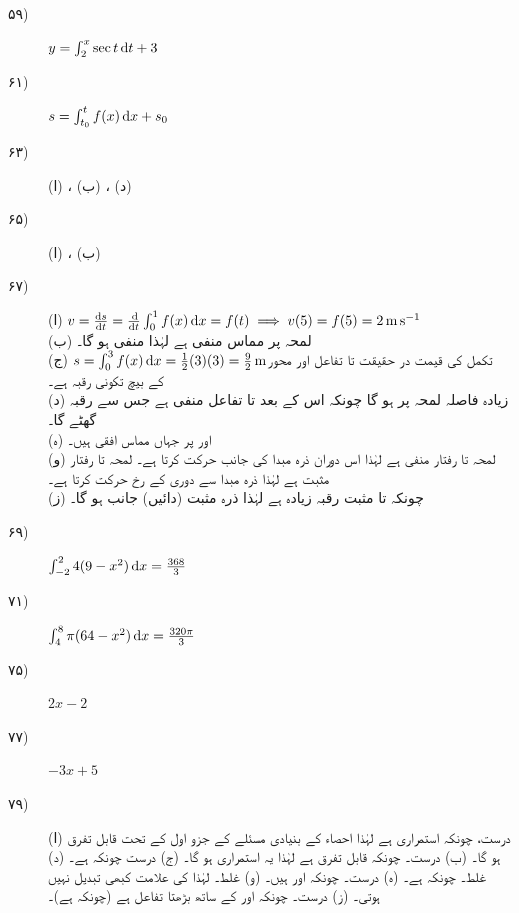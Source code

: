 \begin {description}
\item [
\protect ۵۹)
]
 $y=\int _2^x\sec t\dif t+3$ 
\item [
\protect ۶۱)
]
 $s=\int _{t_0}^tf(x)\dif x+s_0$ 
\item [
\protect ۶۳)
]
 (ا) ، (ب) ، (د)  
\item [
\protect ۶۵)
]
 (ا) ، (ب)  
\item [
\protect ۶۷)
]
 (ا) $v=\tfrac {\dif s}{\dif t}=\tfrac {\dif }{\dif t}\int _0^1f(x)\dif x=f(t)\implies v(5)=f(5)=\SI {2}{\meter \per \second }$\\ (ب) لمحہ  پر مماس منفی ہے لہٰذا  منفی ہو گا۔\\ (ج) $s=\int _0^3f(x)\dif x=\tfrac {1}{2}(3)(3)=\tfrac {9}{2}\,\si {\meter }$\quad تکمل کی قیمت در حقیقت  تا  تفاعل  اور محور  کے بیچ تکونی رقبہ ہے۔\\ (د) زیادہ فاصلہ لمحہ  پر ہو گا چونکہ اس کے بعد  تا  تفاعل  منفی ہے جس سے رقبہ گھٹے گا۔\\ (ہ)  اور  پر جہاں مماس افقی ہیں۔\\ (و) لمحہ  تا  رفتار منفی ہے لہٰذا اس دوران ذرہ مبدا کی جانب حرکت کرتا ہے۔ لمحہ  تا  رفتار مثبت ہے لہٰذا ذرہ مبدا سے دوری کے رخ حرکت کرتا ہے۔\\ (ز) چونکہ  تا مثبت رقبہ زیادہ ہے لہٰذا ذرہ مثبت (دائیں) جانب ہو گا۔ 
\item [
\protect ۶۹)
]
 $\int _{-2}^2 4(9-x^2)\dif x=\tfrac {368}{3}$ 
\item [
\protect ۷۱)
]
 $\int _4^8\pi (64-x^2)\dif x=\tfrac {320\pi }{3}$ 
\item [
\protect ۷۵)
]
 $2x-2$ 
\item [
\protect ۷۷)
]
 $-3x+5$ 
\item [
\protect ۷۹)
]
 (ا) درست، چونکہ  استمراری ہے لہٰذا احصاء کے بنیادی مسئلے کے جزو اول کے تحت  قابل تفرق ہو گا۔ (ب) درست۔ چونکہ  قابل تفرق ہے لہٰذا یہ استمراری ہو گا۔ (ج) درست چونکہ  ہے۔ (د) غلط۔ چونکہ  ہے۔ (ہ) درست۔ چونکہ  اور  ہیں۔ (و) غلط۔  لہٰذا  کی علامت کبھی تبدیل نہیں ہوتی۔ (ز) درست۔ چونکہ  اور  کے ساتھ  بڑھتا تفاعل ہے (چونکہ  ہے)۔ 
\end {description}

